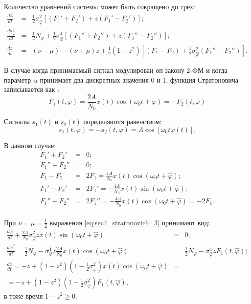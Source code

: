 Количество уравнений системы может быть сокращено до трех:
\begin{eqnarray}
	\frac{d \hat{\varphi}}{dt} & = & \frac{1}{2}\sigma_{\hat{\varphi}}^2 \left[(F_{1}' + F_{2}') + z(F_{1}' - F_{2}') \right]; \nonumber \\
	\frac{d \sigma_{\hat{\varphi}}^2}{dt} & = & \frac{1}{2}N_{\varphi} + \frac{1}{2}\sigma_{\hat{\varphi}}^4 \left[ (F_{1}'' + F_{2}'') +  z(F_{1}'' - F_{2}'') \right]; \\
	\frac{dz}{dt} & = & (\nu - \mu) - (\nu + \mu)z + \frac{1}{2}(1 - z^2) \left[ (F_{1} - F_{2}) +  \frac{1}{2} \sigma_{\hat{\varphi}}^2 (F_{1}'' - F_{2}'') \right]. \nonumber
	\label{eq:sec4_stratonovich_3}
\end{eqnarray}

В случае когда принимаемый сигнал модулирован оп закону 2-ФМ и когда параметр ${\alpha}$ принимает два дискретных значения 0 и 1,
функция Стратоновича записывается как \cite{shahtarin-wiener-kalman}:
\begin{equation}
	F_1(t, \varphi) = \frac{2A}{N_0}x(t) \cos (\omega_0 t + \varphi) = -F_2(t, \varphi)
	\label{eq:sec4_stratonovich_bpsk}
\end{equation}

Сигналы ${s_1(t)}$ и ${s_2(t)}$ определяются равенством: 
\begin{equation}
	s_1(t, \varphi) = -s_2(t, \varphi) = A \cos \left[ \omega_0 t \varphi(t) \right].
	\label{eq:sec4_s1_s2}
\end{equation}

В данном случае:
\begin{eqnarray}
	F_1' + F_2' & = & 0; \nonumber \\
	F_1'' + F_2'' & = & 0; \nonumber \\
	F_1 - F_2 & = & 2F_1 = \frac{4A}{N_0}x(t) \cos(\omega_0 t + \hat{\varphi}); \nonumber \\
	F_1' - F_2' & = & 2F_1' = -\frac{4A}{N_0}x(t) \sin(\omega_0 t + \hat{\varphi}); \nonumber \\
	F_1'' - F_2'' & = & 2F_1'' = -\frac{4A}{N_0}x(t) \cos(\omega_0 t + \hat{\varphi}) = -2F_1. \nonumber \\
	\label{eq:sec4_strat_der}
\end{eqnarray}

При ${\nu = \mu = \frac{1}{2}}$ выражения \ref{eq:sec4_stratonovich_3} принимают вид:
\begin{eqnarray}
	\frac{d \hat{\varphi}}{dt} + \frac{2A}{N_0} \sigma_{\hat{\varphi}}^2 z x(t) \sin (\omega_0 t + \hat{\varphi}) & = & 0; \nonumber \\
	\frac{d \hat{\varphi}^2}{dt} = \frac{1}{2} N_{\varphi} - \sigma_{\hat{\varphi}}^4 z \frac{2A}{N_0} x(t) \cos(\omega_0 t + \hat{\varphi}) & = & \frac{1}{2}N_{\varphi} - \sigma_{\hat{\varphi}}^4 zF_1(t, \hat{\varphi}); \nonumber \\
	\frac{dz}{dt} = -z + (1 - z^2) \left( 1 - \frac{1}{2} \sigma_{\hat{\varphi}}^2 \right) x(t) \cos(\omega_0 t + \hat{\varphi}) & = & \nonumber \\
		 = -z + (1 - z^2) \left( 1 - \frac{1}{2} \sigma_{\hat{\varphi}}^2 \right) F_1(t, \hat{\varphi}), & &
	\label{eq:sec4_strat_der111}
\end{eqnarray}
в тоже время ${1 - z^2 \ge 0}$.


